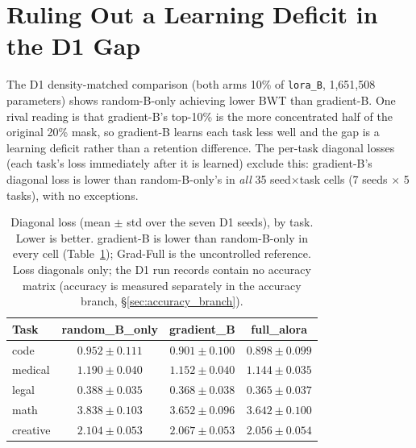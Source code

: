 \section{Ruling Out a Learning Deficit in the D1 Gap}
\label{app:d1_diagonal}

The D1 density-matched comparison (both arms 10\% of \texttt{lora\_B}, 1{,}651{,}508 parameters) shows random-B-only achieving lower BWT than gradient-B. One rival reading is that gradient-B's top-10\% is the more concentrated half of the original 20\% mask, so gradient-B learns each task less well and the gap is a learning deficit rather than a retention difference. The per-task diagonal losses (each task's loss immediately after it is learned) exclude this: gradient-B's diagonal loss is lower than random-B-only's in \emph{all} 35 seed$\times$task cells (7 seeds $\times$ 5 tasks), with no exceptions.

\begin{table}[ht]
\caption{Diagonal loss (mean $\pm$ std over the seven D1 seeds), by task. Lower is better. gradient-B is lower than random-B-only in every cell (Table~\ref{tab:d1_diagonal}); Grad-Full is the uncontrolled reference. Loss diagonals only; the D1 run records contain no accuracy matrix (accuracy is measured separately in the accuracy branch, \S\ref{sec:accuracy_branch}).}
\label{tab:d1_diagonal}
\centering
\small
\begin{tabular}{@{}lccc@{}}
\toprule
\textbf{Task} & \textbf{random\_B\_only} & \textbf{gradient\_B} & \textbf{full\_alora} \\
\midrule
code     & $0.952 \pm 0.111$ & $\mathbf{0.901 \pm 0.100}$ & $0.898 \pm 0.099$ \\
medical  & $1.190 \pm 0.040$ & $\mathbf{1.152 \pm 0.040}$ & $1.144 \pm 0.035$ \\
legal    & $0.388 \pm 0.035$ & $\mathbf{0.368 \pm 0.038}$ & $0.365 \pm 0.037$ \\
math     & $3.838 \pm 0.103$ & $\mathbf{3.652 \pm 0.096}$ & $3.642 \pm 0.100$ \\
creative & $2.104 \pm 0.053$ & $\mathbf{2.067 \pm 0.053}$ & $2.056 \pm 0.054$ \\
\bottomrule
\end{tabular}
\end{table}

